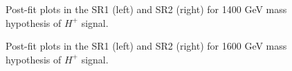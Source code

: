 \begin{figure}[H]
  \centering
  \caption{Post-fit plots in the SR1 (left) and SR2 (right) for 1400 GeV mass hypothesis of $H^{+}$ signal.}
  \label{fig:Postfit_Hp1000_Asimov}
\end{figure}
\begin{figure}[H]
  \centering
  \caption{Post-fit plots in the SR1 (left) and SR2 (right) for 1600 GeV mass hypothesis of $H^{+}$ signal.}
  \label{fig:Postfit_Hp1000_Asimov}
\end{figure}
